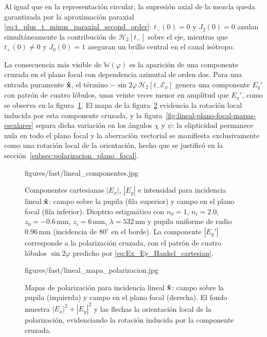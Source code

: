 Al igual que en la representación circular, la supresión axial de la mezcla queda garantizada por la aproximación paraxial \eqref{eq:t_plus_t_minus_paraxial_second_order}: $t_-(0)=0$ y $J_2(0)=0$ anulan simultáneamente la contribución de $\mathscr{H}_2[t_-]$ sobre el eje, mientras que $t_+(0)\neq 0$ y $J_0(0)=1$ aseguran un brillo central en el canal isótropo.

La consecuencia más visible de $\mathbb{W}(\varphi)$ es la aparición de una componente cruzada en el plano focal con dependencia azimutal de orden dos. Para una entrada puramente $\bm{\hat{\mathbf{x}}}$, el término $-\sin 2\varphi\,\mathscr{H}_2[t_-\mathscr{E}_x]$ genera una componente $E_y'$ con patrón de cuatro lóbulos, unas veinte veces menor en amplitud que $E_x'$, como se observa en la figura~\ref{fig:lineal-plano-focal-componentes}. El mapa de la figura~\ref{fig:lineal-plano-focal-mapa-polarizacion} evidencia la rotación local inducida por esta componente cruzada, y la figura~\ref{fig:lineal-plano-focal-mapas-escalares} separa dicha variación en los ángulos $\chi$ y $\psi$: la elipticidad permanece nula en todo el plano focal y la aberración vectorial se manifiesta exclusivamente como una rotación local de la orientación, hecho que se justificó en la sección~\ref{subsec:polarizacion_plano_focal}.

\begin{figure}[!htbp]
  \centering
    {figures/fast/lineal_componentes.jpg}
  \caption{Componentes cartesianas $|E_x|$, $|E_y|$ e intensidad para incidencia lineal $\bm{\hat{\mathbf{x}}}$: campo sobre la pupila (fila superior) y campo en el plano focal (fila inferior). Dioptrio estigmático con $n_0=1$, $n_i=2.0$, $z_0=-0.6\,\mathrm{mm}$, $z_i=6\,\mathrm{mm}$, $\lambda=532\,\mathrm{nm}$ y pupila uniforme de radio $0.96\,\mathrm{mm}$ (incidencia de $80^\circ$ en el borde). La componente $|E_y'|$ corresponde a la polarización cruzada, con el patrón de cuatro lóbulos $\sin 2\varphi$ predicho por \eqref{eq:Ex_Ey_Hankel_cartesian}.}
  \label{fig:lineal-plano-focal-componentes}
\end{figure}

\begin{figure}[!htbp]
  \centering
    {figures/fast/lineal_mapa_polarizacion.jpg}
  \caption{Mapas de polarización para incidencia lineal $\bm{\hat{\mathbf{x}}}$: campo sobre la pupila (izquierda) y campo en el plano focal (derecha). El fondo muestra $|E_x|^2+|E_y|^2$ y las flechas la orientación local de la polarización, evidenciando la rotación inducida por la componente cruzada.}
  \label{fig:lineal-plano-focal-mapa-polarizacion}
\end{figure}

